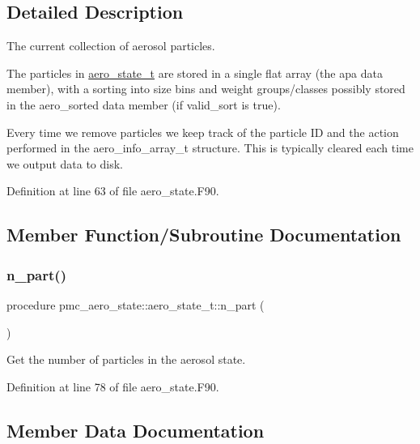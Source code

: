\subsection{Detailed Description}
The current collection of aerosol particles. 

The particles in {\ttfamily \mbox{\hyperlink{structpmc__aero__state_1_1aero__state__t}{aero\+\_\+state\+\_\+t}}} are stored in a single flat array (the {\ttfamily apa} data member), with a sorting into size bins and weight groups/classes possibly stored in the {\ttfamily aero\+\_\+sorted} data member (if {\ttfamily valid\+\_\+sort} is true).

Every time we remove particles we keep track of the particle ID and the action performed in the aero\+\_\+info\+\_\+array\+\_\+t structure. This is typically cleared each time we output data to disk. 

Definition at line 63 of file aero\+\_\+state.\+F90.



\subsection{Member Function/\+Subroutine Documentation}
\mbox{\label{structpmc__aero__state_1_1aero__state__t_ae4c0b9d8e26a78cc678af107994742e0}} 
\subsubsection{\texorpdfstring{n\+\_\+part()}{n\_part()}}
{\footnotesize\ttfamily procedure pmc\+\_\+aero\+\_\+state\+::aero\+\_\+state\+\_\+t\+::n\+\_\+part (\begin{DoxyParamCaption}{ }\end{DoxyParamCaption})}



Get the number of particles in the aerosol state. 



Definition at line 78 of file aero\+\_\+state.\+F90.



\subsection{Member Data Documentation}
\mbox{\label{structpmc__aero__state_1_1aero__state__t_a2fe4dc14d229409549af2aa7876a974c}} 
